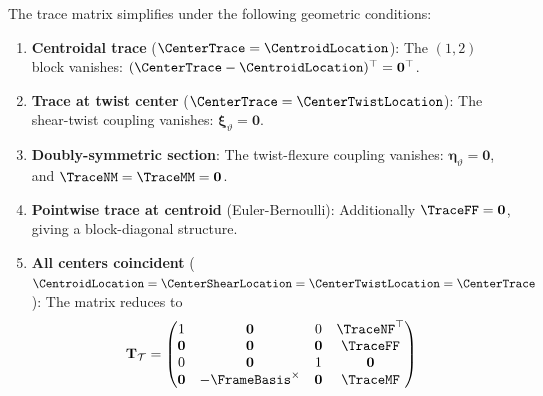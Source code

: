 \begin{corollary}
\label{cor:simplifications}
The trace matrix simplifies under the following geometric conditions:
\begin{enumerate}
\item \textbf{Centroidal trace} ($\CenterTrace = \CentroidLocation$): 
The $(1,2)$ block vanishes: $(\CenterTrace - \CentroidLocation)^\top = \mathbf{0}^\top$.

\item \textbf{Trace at twist center} ($\CenterTrace = \CenterTwistLocation$): 
The shear-twist coupling vanishes: $\bm{\xi}_\vartheta = \mathbf{0}$.

\item \textbf{Doubly-symmetric section}: 
The twist-flexure coupling vanishes: $\bm{\eta}_\vartheta = \mathbf{0}$, 
and $\TraceNM = \TraceMM = \mathbf{0}$.

\item \textbf{Pointwise trace at centroid} (Euler-Bernoulli): 
Additionally $\TraceFF = \mathbf{0}$, giving a block-diagonal structure.

\item \textbf{All centers coincident} 
($\CentroidLocation = \CenterShearLocation = \CenterTwistLocation = \CenterTrace$): 
The matrix reduces to
\begin{equation}
\mathbf{T}_{\mathcal{T}} = \begin{pmatrix}
1 & \mathbf{0} & 0 & \TraceNF^\top \\
\mathbf{0} & \mathbf{0} & \mathbf{0} & \TraceFF \\
0 & \mathbf{0} & 1 & \mathbf{0} \\
\mathbf{0} & -\FrameBasis^{\times} & \mathbf{0} & \TraceMF
\end{pmatrix}
\label{eq:trace-matrix-symmetric}
\end{equation}
\end{enumerate}
\end{corollary}

